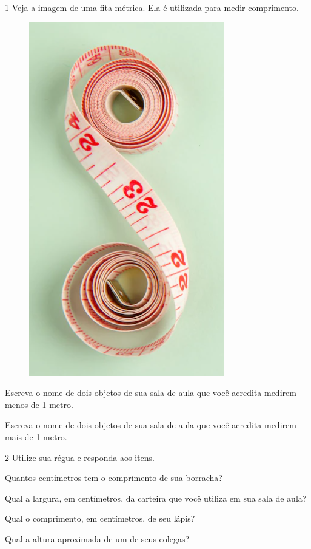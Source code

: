 
\num{1} Veja a imagem de uma fita métrica. Ela é utilizada para medir comprimento.

\begin{figure}[htpb!]
\centering
\includegraphics[width=.3\textwidth]{./media/image41.png}
\end{figure}

\begin{escolha}
\item Escreva o nome de dois objetos de sua sala de aula que você acredita
  medirem menos de 1 metro.


\item Escreva o nome de dois objetos de sua sala de aula que você acredita
  medirem mais de 1 metro.

\end{escolha}

\num{2} Utilize sua régua e responda aos itens.

\begin{escolha}
\item Quantos centímetros tem o comprimento de sua borracha?


\item Qual a largura, em centímetros, da carteira que você utiliza em sua sala de aula?


\item Qual o comprimento, em centímetros, de seu lápis?


\item Qual a altura aproximada de um de seus colegas?

\end{escolha}

